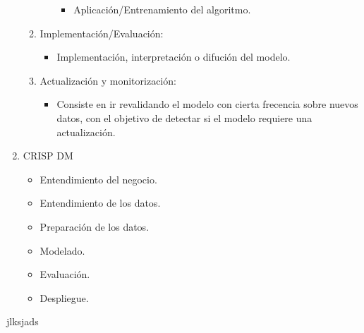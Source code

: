 \begin{enumerate}
\begin{enumerate}
\begin{itemize}
\begin{itemize}
                \item Aplicaci\'on/Entrenamiento del algoritmo.
            \end{itemize}    
        \end{itemize}
        \item Implementaci\'on/Evaluaci\'on: 
        \begin{itemize}
            \item Implementaci\'on, interpretaci\'on o difuci\'on del modelo.
        \end{itemize}
        \item Actualizaci\'on y monitorizaci\'on:
        \begin{itemize}
            \item Consiste en ir revalidando el modelo con cierta frecencia sobre nuevos datos, 
                con el objetivo de detectar si el modelo requiere una actualizaci\'on.
        \end{itemize}
    \end{enumerate}
    \item CRISP DM
    \begin{itemize}
        \item Entendimiento del negocio.
        \item Entendimiento de los datos.
        \item Preparaci\'on de los datos.
        \item Modelado.
        \item Evaluaci\'on.
        \item Despliegue.
    \end{itemize}
\end{enumerate}
jlksjads

